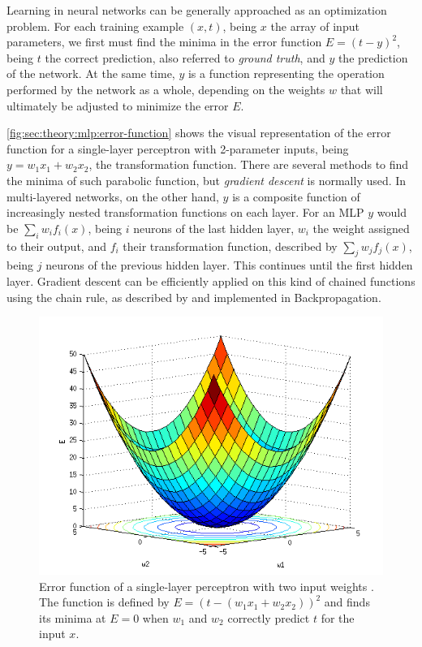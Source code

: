 Learning in neural networks can be generally approached as an optimization problem.
For each training example $(x, t)$, being $x$ the array of input parameters, we first must find the minima in the error function $E = (t - y)^2$, being $t$ the correct prediction, also referred to \emph{ground truth}, and $y$ the prediction of the network.
At the same time, $y$ is a function representing the operation performed by the network as a whole, depending on the weights $w$ that will ultimately be adjusted to minimize the error $E$.

\autoref{fig:sec:theory:mlp:error-function} shows the visual representation of the error function for a single-layer perceptron with 2-parameter inputs, being $y = w_1 x_1 + w_2 x_2$, the transformation function.
There are several methods to find the minima of such parabolic function, but \emph{gradient descent} is normally used.
In multi-layered networks, on the other hand, $y$ is a composite function of increasingly nested transformation functions on each layer.
For an MLP $y$ would be $\sum_i w_i f_i(x)$, being $i$ neurons of the last hidden layer, $w_i$ the weight assigned to their output, and $f_i$ their transformation function, described by $\sum_j w_j f_j(x)$, being $j$ neurons of the previous hidden layer.
This continues until the first hidden layer.
Gradient descent can be efficiently applied on this kind of chained functions using the chain rule, as described by \citet{Linnainmaa1976} and implemented in Backpropagation.

\begin{figure}[htb]
  \includegraphics[width=\textwidth]{gfx/error-function}
  \caption{Error function of a single-layer perceptron with two input weights \cite{AI4562013}.
    The function is defined by $E = (t - (w_1 x_1 + w_2 x_2))^2$ and finds its minima at $E = 0$ when $w_1$ and $w_2$ correctly predict $t$ for the input $x$.}
  \label{fig:sec:theory:mlp:error-function}
\end{figure}

